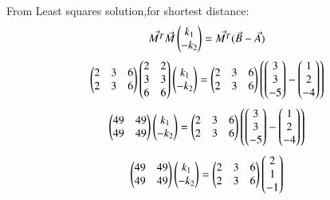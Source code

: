 \documentclass[journal]{IEEEtran}
\theoremstyle{remark}
\begin{document}
From Least squares solution,for shortest distance:
\begin{align}
    \Vec{M^T}\Vec{M}\myvec{k_1\\-k_2}=\Vec{M^T}(\Vec{B}-\Vec{A})
\end{align}
\begin{align}
    \myvec{2&3&6\\2&3&6}\myvec{2&2\\3&3\\6&6}\myvec{k_1\\-k_2}=\myvec{2&3&6\\2&3&6}\brak{\myvec{3\\3\\-5}-\myvec{1\\2\\-4}}
\end{align}
\begin{align}
\myvec{49&49\\49&49}\myvec{k_1\\-k_2}=\myvec{2&3&6\\2&3&6}\brak{\myvec{3\\3\\-5}-\myvec{1\\2\\-4}}
\end{align}
\begin{align}
    \myvec{49&49\\49&49}\myvec{k_1\\-k_2}=\myvec{2&3&6\\2&3&6}\myvec{2\\1\\-1}
\end{align}
\end{document}
